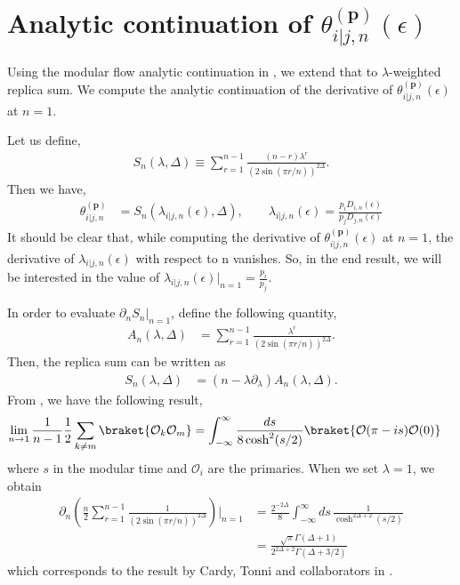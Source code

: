 \documentclass[11pt]{article}
\newcommand{\ep}{\epsilon}
\newcommand{\p}{\partial}
\newcommand{\mO}{\mathcal{O}}
\newcommand{\lb}{\left(}
\newcommand{\rb}{\right)}
\begin{document}
\section{\texorpdfstring{Analytic continuation of $\theta_{i|j,n}^{(\textbf{p})}(\ep)$}{Analytic continuation of theta}}
Using the modular flow analytic continuation in \cite{S_rosi_2018}, we extend that to $\lambda$-weighted replica sum. We compute the analytic continuation of the derivative of $\theta_{i|j,n}^{(\textbf{p})}(\ep)$ at $n=1$. 

Let us define,
\begin{align}
    {S}_n(\lambda,\Delta) \equiv \sum_{r=1}^{n-1} \frac{(n-r)\lambda^r }{\lb 2\sin(\pi r/n)\rb^{2\Delta}}.
\end{align}
Then we have,
\begin{align}
    \theta_{i|j,n}^{(\textbf{p})} &= S_n(\lambda_{i|j,n}(\ep),\Delta),  \qquad \lambda_{i|j,n}(\ep)= \frac{p_i D_{i,n}(\ep)}{p_j D_{j,n}(\ep)}
\end{align}
It should be clear that, while computing the derivative of $\theta_{i|j,n}^{(\textbf{p})}(\ep)$ at $n=1$, the derivative of $\lambda_{i|j,n}(\ep)$ with respect to n vanishes. So, in the end result, we will be interested in the value of $\lambda_{i|j,n}(\ep)\big|_{n=1} = \frac{p_i }{p_j}$. 

In order to evaluate $\p_n {S}_n |_{n=1}$, define the following quantity,
\begin{align}
    A_{n}(\lambda,\Delta) &= \sum_{r=1}^{n-1}\frac{\lambda^r}{\lb2\sin(\pi r/n)\rb^{2\Delta}}.
\end{align}
Then, the replica sum can be written as
\begin{align}
    {S}_n(\lambda,\Delta) &= (n-\lambda \p _\lambda)A_{n}(\lambda,\Delta).
\end{align}
From \cite{S_rosi_2018}, we have the following result,
\begin{align}
    \lim_{n\to 1}\frac{1}{n-1}\frac{1}{2}\sum_{k\neq m} \braket{\mO _k \mO_m} &= \int_{-\infty}^\infty \frac{ds}{8\cosh^2 (s/2)} \braket{\mO(\pi - is) \mO(0)}
\end{align}
where $s$ in the modular time and $\mO_i$ are the primaries.
When we set $\lambda =1$, we obtain
\begin{align}
    \p_n \lb \frac{n}{2} \sum_{r=1}^{n-1}\frac{1}{\lb 2\sin(\pi r/n) \rb^{2\Delta}}\rb\Bigg|_{n=1}
    &=\frac{2^{-2\Delta}}{8} \int_{-\infty}^\infty ds\, \frac{1}{\cosh^{2\Delta +2}(s/2)} \\
    &= \frac{\sqrt \pi \Gamma(\Delta +1)}{2^{2\Delta +2} \Gamma(\Delta  + 3/2)}
\end{align} 
which corresponds to the result by Cardy, Tonni and collaborators in \cite{calabrese2011entanglement}.
\end{document}
